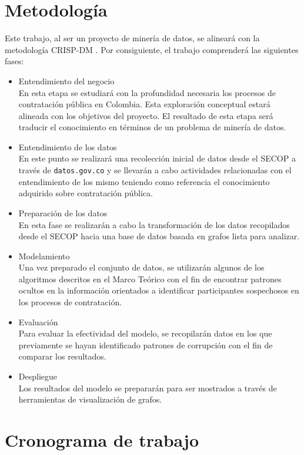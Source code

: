 \documentclass[11pt,letterpaper,oneside]{article}
\begin{document}
\section{Metodología}
Este trabajo, al ser un proyecto de minería de datos, se alineará con la metodología CRISP-DM \cite{crispdm-2000}. Por consiguiente, el trabajo comprenderá las siguientes fases:
\begin{itemize}
\item Entendimiento del negocio\\
En esta etapa se estudiará con la profundidad necesaria los procesos de contratación pública en Colombia. Esta exploración conceptual estará alineada con los objetivos del proyecto. El resultado de esta etapa será traducir el conocimiento en términos de un problema de minería de datos.
\item Entendimiento de los datos\\
En este punto se realizará una recolección inicial de datos desde el SECOP a través de \texttt{datos.gov.co} y se llevarán a cabo actividades relacionadas con el entendimiento de los mismo teniendo como referencia el conocimiento adquirido sobre contratación pública.
\item Preparación de los datos\\
En esta fase se realizarán a cabo la transformación de los datos recopilados desde el SECOP hacia una base de datos basada en grafos lista para analizar.
\item Modelamiento\\
Una vez preparado el conjunto de datos, se utilizarán algunos de los algoritmos descritos en el Marco Teórico con el fin de encontrar patrones ocultos en la información orientados a identificar participantes sospechosos en los procesos de contratación.
\item Evaluación\\
Para evaluar la efectividad del modelo, se recopilarán datos en los que previamente se hayan identificado patrones de corrupción con el fin de comparar los resultados.
\item Despliegue\\
Los resultados del modelo se prepararán para ser mostrados a través de herramientas de visualización de grafos.
\end{itemize}

\newpage
\section{Cronograma de trabajo}
\end{document}
